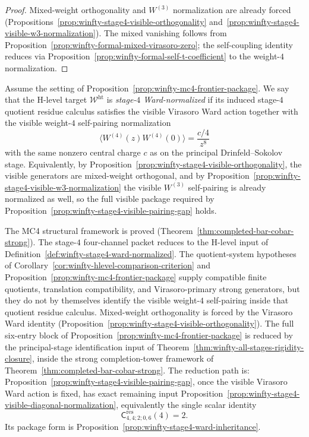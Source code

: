\begin{proof}
Mixed-weight orthogonality and $W^{(3)}$ normalization are already forced (Propositions~\ref{prop:winfty-stage4-visible-orthogonality} and~\ref{prop:winfty-stage4-visible-w3-normalization}). The mixed vanishing follows from Proposition~\ref{prop:winfty-formal-mixed-virasoro-zero}; the self-coupling identity reduces via Proposition~\ref{prop:winfty-formal-self-t-coefficient} to the weight-$4$ normalization.
\end{proof}

\begin{definition}
\label{def:winfty-stage4-ward-normalized}
Assume the setting of
Proposition~\ref{prop:winfty-mc4-frontier-package}. We say that the
H-level target $\mathcal{W}^{\mathrm{ht}}$ is
\emph{stage-$4$ Ward-normalized} if its induced stage-$4$ quotient
residue calculus satisfies the visible Virasoro Ward action together
with the visible weight-$4$ self-pairing normalization
\[
\langle W^{(4)}(z)W^{(4)}(0)\rangle=\frac{c/4}{z^{8}}
\]
with the same nonzero central charge $c$ as on the principal
Drinfeld--Sokolov stage. Equivalently, by
Proposition~\ref{prop:winfty-stage4-visible-orthogonality}, the
visible generators are mixed-weight orthogonal, and by
Proposition~\ref{prop:winfty-stage4-visible-w3-normalization} the
visible $W^{(3)}$ self-pairing is already normalized as well, so the
full visible package required by
Proposition~\ref{prop:winfty-stage4-visible-pairing-gap} holds.
\end{definition}

\begin{remark}
\label{rem:winfty-stage4-four-channel-gap}
The MC4 structural framework is proved
(Theorem~\ref{thm:completed-bar-cobar-strong}). The stage-$4$
four-channel packet reduces to the H-level input of
Definition~\ref{def:winfty-stage4-ward-normalized}. The
quotient-system hypotheses of
Corollary~\ref{cor:winfty-hlevel-comparison-criterion} and
Proposition~\ref{prop:winfty-mc4-frontier-package} supply compatible
finite quotients, translation compatibility, and Virasoro-primary
strong generators, but they do not by themselves identify the
visible weight-$4$ self-pairing inside that quotient residue calculus.
Mixed-weight orthogonality is forced by the Virasoro Ward
identity
(Proposition~\ref{prop:winfty-stage4-visible-orthogonality}). The
full six-entry block of
Proposition~\ref{prop:winfty-mc4-frontier-package} is reduced by the
principal-stage identification input of
Theorem~\ref{thm:winfty-all-stages-rigidity-closure}, inside the
strong completion-tower framework of
Theorem~\ref{thm:completed-bar-cobar-strong}.
The reduction path is:
Proposition~\ref{prop:winfty-stage4-visible-pairing-gap}, once the
visible Virasoro Ward action is fixed, has exact remaining input
Proposition~\ref{prop:winfty-stage4-visible-diagonal-normalization},
equivalently the single scalar identity
\[
\mathsf{C}^{\mathrm{res}}_{4,4;2;0,6}(4)=2.
\]
Its package form is
Proposition~\ref{prop:winfty-stage4-ward-inheritance}.
\end{remark}


